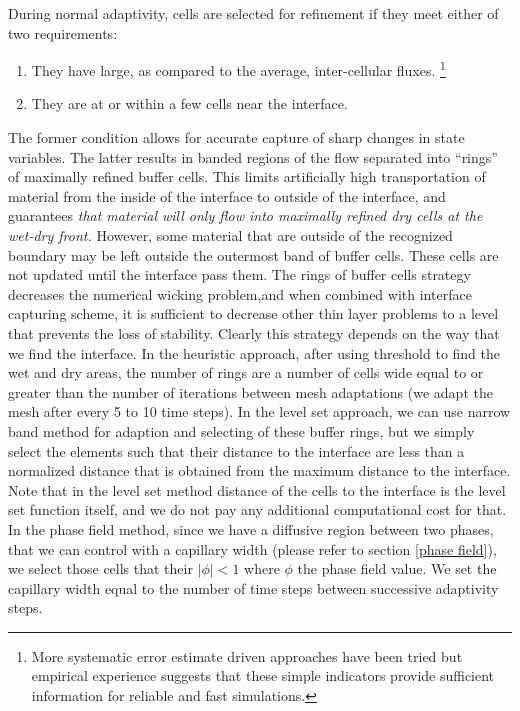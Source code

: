 \documentclass[letterpaper,10pt]{article}
\begin{document}
During normal adaptivity, cells are selected for refinement if they meet 
either of two requirements:
\begin{enumerate} 
	\item They have large, as compared to the average, inter-cellular fluxes. \footnote{More systematic error estimate driven approaches have been tried \cite{} but 
	empirical experience suggests that these simple indicators   provide sufficient information for reliable and fast simulations.}
	\item They are at or within a few cells near the interface.
\end{enumerate}
The former condition allows for accurate capture of sharp changes in state variables. The latter results in banded regions of the flow separated into ``rings'' of maximally refined buffer cells.  
This limits artificially high transportation of material from the inside of the interface to outside of the interface, and guarantees {\it that material will only flow into maximally refined dry 
cells at the wet-dry front.  }
However, some material that are outside of the recognized boundary may be left outside the outermost band of buffer cells. These cells are not updated until the interface pass them.
The rings of buffer cells strategy decreases the numerical wicking problem,and when combined with interface capturing scheme, it is sufficient to decrease other thin layer problems to a level that 
prevents the loss of stability.
Clearly this strategy depends on the way that we find the interface. In  the heuristic approach, after using threshold to find the wet and dry areas, the number of rings are a number of cells wide 
equal to or greater than the number of iterations between mesh adaptations (we adapt the mesh after every 5 to 10 time steps). In the level set approach, we can use narrow band method for adaption 
and selecting of these buffer rings, but we simply select the elements such that their distance to the interface are less than a normalized distance that is obtained from the maximum distance to the interface. 
Note that in the level set method distance of the cells to the interface is the level set function itself, and we do not pay any additional computational cost for that. In the phase field method, 
since we have a diffusive region between two phases, that we can control  with a capillary width (please refer to section \ref{phase field}), we select those cells that their $|\phi| <1 $ where $\phi$ 
 the phase field value. We set the capillary width equal to the number of time steps between successive adaptivity steps.
\end{document}
